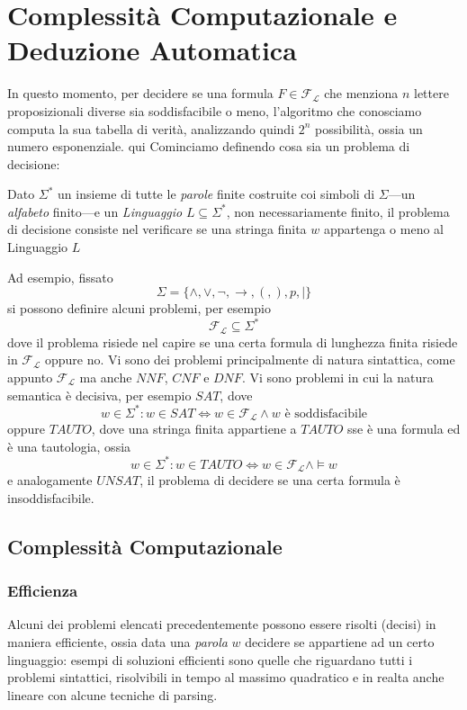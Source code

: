 \chapter{Complessità Computazionale e Deduzione Automatica}

In questo momento, per decidere se una formula $F \in \mathscr{F}_\mathscr{L}$ che menziona $n$ lettere proposizionali diverse sia soddisfacibile o meno, l'algoritmo che conosciamo computa la sua tabella di verità, analizzando quindi $2^n$ possibilità, ossia un numero esponenziale. 
qui
Cominciamo definendo cosa sia un problema di decisione:
\begin{defi}
Dato $\Sigma^*$ un insieme di tutte le \textit{parole} finite costruite coi simboli di $\Sigma$—un \textit{alfabeto} finito—e un \textit{Linguaggio} $L \subseteq \Sigma^*$, non necessariamente finito, il problema di decisione consiste nel verificare se una stringa finita $w$ appartenga o meno al Linguaggio $L$
\end{defi}

Ad esempio, fissato 
$$
\Sigma = \{\land, \lor, \neg, \rightarrow, (, ), p, |\}
$$
si possono definire alcuni problemi, per esempio
$$
\mathscr{F}_\mathscr{L} \subseteq \Sigma ^*
$$
dove il problema risiede nel capire se una certa formula di lunghezza finita
risiede in $\mathscr{F}_\mathscr{L}$ oppure no. 
Vi sono dei problemi principalmente di natura sintattica, come appunto $\mathscr{F}_\mathscr{L}$ 
ma anche $NNF$, $CNF$ e $DNF$. Vi sono problemi in cui la natura semantica 
è decisiva, per esempio $SAT$, dove 
$$
w \in \Sigma^* : w\in SAT \iff w \in \mathscr{F}_\mathscr{L} \land w \text{ è soddisfacibile}
$$
oppure $TAUTO$, dove una stringa finita appartiene a $TAUTO$ sse è una formula ed è una tautologia, ossia
$$
w \in \Sigma^* : w \in TAUTO \iff w \in \mathscr{F}_\mathscr{L} \land \models w
$$
e analogamente $UNSAT$, il problema di decidere se una certa formula è
insoddisfacibile.

\section{Complessità Computazionale}
\subsection{Efficienza}
Alcuni dei problemi elencati precedentemente possono essere risolti (decisi) 
in maniera efficiente, ossia data una \textit{parola} $w$ decidere se 
appartiene ad un certo linguaggio: esempi di soluzioni efficienti sono 
quelle che riguardano tutti i problemi sintattici, risolvibili in tempo 
al massimo quadratico e in realta anche lineare con alcune tecniche di parsing. 

